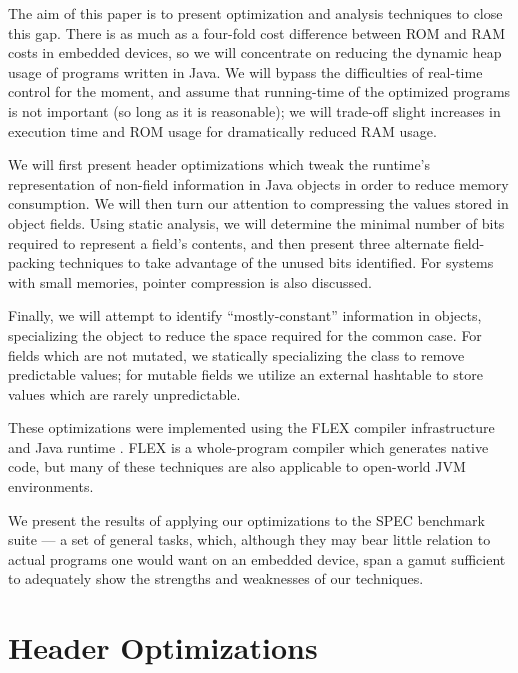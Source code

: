 \documentclass[preprint]{acmconf}
\begin{document}
The aim of this paper is to present optimization and analysis
techniques to close this gap.  There is as much as a four-fold
cost difference between ROM and RAM costs in embedded devices,
so we will concentrate on reducing the dynamic heap usage of
programs written in Java.  We will bypass the difficulties of
real-time control
for the moment, and assume that running-time of the optimized programs
is not important (so long as it is reasonable); we will trade-off
slight increases in execution time and ROM usage for dramatically
reduced RAM usage.

We will first present header optimizations which tweak the runtime's
representation of non-field information in Java objects in order to
reduce memory consumption.  We will then turn our attention to
compressing the values stored in object fields.  Using static
analysis, we will determine the minimal number of bits required to
represent a field's contents, and then present three alternate
field-packing techniques to take advantage of the unused bits
identified.  For systems with small memories, pointer compression is
also discussed.

Finally, we will attempt to identify ``mostly-constant'' information in
objects, specializing the object to reduce the space required for
the common case.  For fields which are not mutated, we statically
specializing the class to remove predictable values;
for mutable fields we utilize an
external hashtable to store values which are rarely unpredictable.

These optimizations were implemented using the FLEX compiler
infrastructure and Java runtime \cite{flexweb}.  FLEX is a
whole-program compiler which generates native code, but many of these
techniques are also applicable to open-world JVM environments.

We present the results of applying our optimizations to the SPEC
benchmark suite --- a set of general tasks, which, although they may bear
little relation to actual programs one would want on an embedded
device, span a gamut sufficient to adequately show the strengths and
weaknesses of our techniques.


\section{Header Optimizations}
\end{document}
